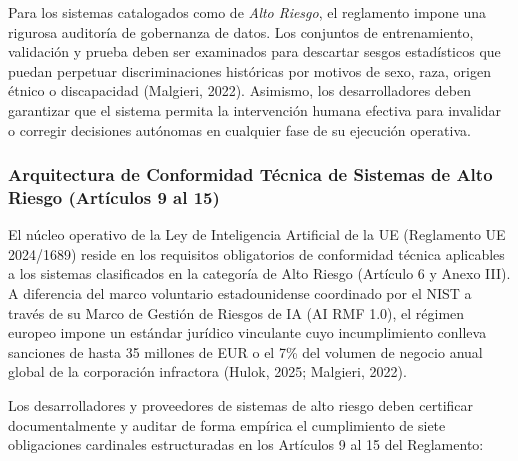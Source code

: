 Para los sistemas catalogados como de \textit{Alto Riesgo}, el reglamento impone una rigurosa auditoría de gobernanza de datos. Los conjuntos de entrenamiento, validación y prueba deben ser examinados para descartar sesgos estadísticos que puedan perpetuar discriminaciones históricas por motivos de sexo, raza, origen étnico o discapacidad (Malgieri, 2022). Asimismo, los desarrolladores deben garantizar que el sistema permita la intervención humana efectiva para invalidar o corregir decisiones autónomas en cualquier fase de su ejecución operativa.


\subsubsection{Arquitectura de Conformidad Técnica de Sistemas de Alto Riesgo (Artículos 9 al 15)}

El núcleo operativo de la Ley de Inteligencia Artificial de la UE (Reglamento UE 2024/1689) reside en los requisitos obligatorios de conformidad técnica aplicables a los sistemas clasificados en la categoría de Alto Riesgo (Artículo 6 y Anexo III). A diferencia del marco voluntario estadounidense coordinado por el NIST a través de su Marco de Gestión de Riesgos de IA (AI RMF 1.0), el régimen europeo impone un estándar jurídico vinculante cuyo incumplimiento conlleva sanciones de hasta 35 millones de EUR o el 7\% del volumen de negocio anual global de la corporación infractora (Hulok, 2025; Malgieri, 2022).

Los desarrolladores y proveedores de sistemas de alto riesgo deben certificar documentalmente y auditar de forma empírica el cumplimiento de siete obligaciones cardinales estructuradas en los Artículos 9 al 15 del Reglamento:

